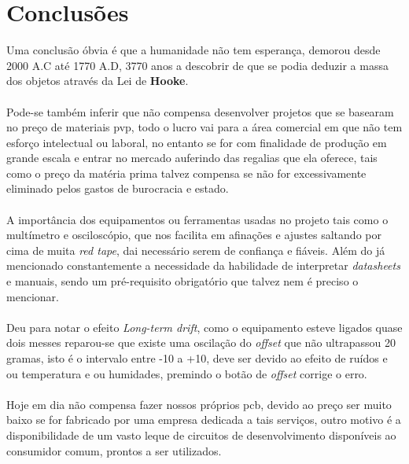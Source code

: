 \chapter{Conclusões}
Uma conclusão óbvia é que a humanidade não tem esperança, demorou desde 2000 A.C até 1770 A.D, 3770 anos a descobrir de que se podia deduzir a massa dos objetos através da Lei de \textbf{Hooke}.
\\
\\
Pode-se também inferir que não compensa desenvolver projetos que se basearam no preço de materiais \ac{pvp}, todo o lucro vai para a área comercial em que não tem esforço intelectual ou laboral, no entanto se for com finalidade de produção em grande escala e entrar no mercado auferindo das regalias que ela oferece, tais como o preço da matéria prima talvez compensa se não for excessivamente eliminado pelos gastos de burocracia e estado.
\\
\\
A importância dos equipamentos ou ferramentas usadas no projeto tais como o multímetro e osciloscópio, que nos facilita em afinações e ajustes saltando por cima de muita \textit{red tape}, dai necessário serem de confiança e fiáveis. Além do já mencionado constantemente a necessidade da habilidade de interpretar \textit{datasheets} e manuais, sendo um pré-requisito obrigatório que talvez nem é preciso o mencionar.
\\
\\
Deu para notar o efeito \textit{Long-term drift}, como o equipamento esteve ligados quase dois messes reparou-se que existe uma oscilação do \textit{offset} que não ultrapassou 20 gramas, isto é o intervalo entre -10 a +10, deve ser devido ao efeito de ruídos e ou temperatura e ou humidades, premindo o botão de \textit{offset} corrige o erro.
\\
\\
Hoje em dia não compensa fazer nossos próprios \ac{pcb}, devido ao preço ser muito baixo se for fabricado por uma empresa dedicada a tais serviços, outro motivo é a disponibilidade  de um vasto leque de circuitos de desenvolvimento disponíveis ao consumidor comum, prontos a ser utilizados.
\newpage
